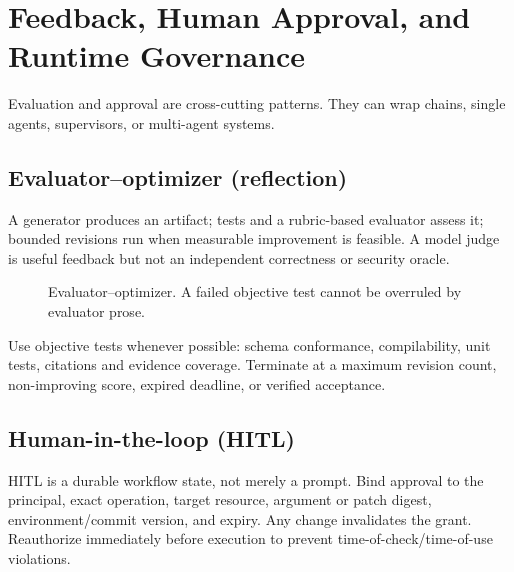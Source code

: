 
\section{Feedback, Human Approval, and Runtime Governance}
Evaluation and approval are cross-cutting patterns. They can wrap chains, single agents, supervisors, or multi-agent systems.

\subsection{Evaluator--optimizer (reflection)}
A generator produces an artifact; tests and a rubric-based evaluator assess it; bounded revisions run when measurable improvement is feasible. A model judge is useful feedback but not an independent correctness or security oracle.

\begin{figure}[htbp]\centering
{}
\caption{Evaluator--optimizer. A failed objective test cannot be overruled by evaluator prose.}
\label{fig:evaluator}
\end{figure}

Use objective tests whenever possible: schema conformance, compilability, unit tests, citations and evidence coverage. Terminate at a maximum revision count, non-improving score, expired deadline, or verified acceptance.

\subsection{Human-in-the-loop (HITL)}
HITL is a durable workflow state, not merely a prompt. Bind approval to the principal, exact operation, target resource, argument or patch digest, environment/commit version, and expiry. Any change invalidates the grant. Reauthorize immediately before execution to prevent time-of-check/time-of-use violations.

